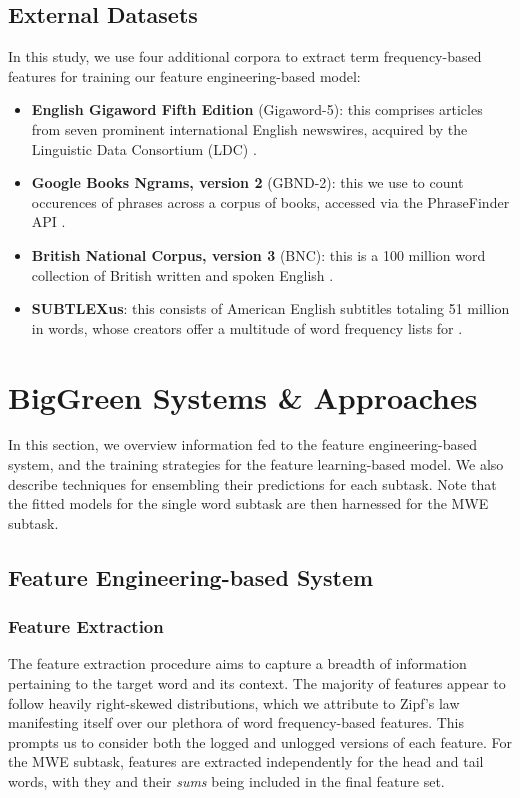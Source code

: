 \documentclass[11pt,a4paper]{article}
\begin{document}
\subsection{External Datasets}

In this study, we use four additional corpora to extract term frequency-based features for training our feature engineering-based model:

\begin{itemize}
  \item \textbf{English Gigaword Fifth Edition} (Gigaword-5): this comprises articles from seven prominent international English newswires, acquired by the Linguistic Data Consortium (LDC) \citep{gigaword}.
  \item \textbf{Google Books Ngrams, version 2} (GBND-2): this we use to count occurences of phrases across a corpus of books, accessed via the PhraseFinder API \citep{phrasefinder}.
  \item \textbf{British National Corpus, version 3} (BNC): this is a 100 million word collection of British written and spoken English \citep{BNC}.
  \item \textbf{SUBTLEXus}: this consists of American English subtitles totaling 51 million in words, whose creators offer a multitude of word frequency lists for \citep{Brysbaert2009MovingBK}.
\end{itemize}

\section{BigGreen Systems \& Approaches}

In this section, we overview information fed to the feature engineering-based system, and the training strategies for the feature learning-based model. We also describe techniques for ensembling their predictions for each subtask. Note that the fitted models for the single word subtask are then harnessed for the MWE subtask.

\subsection{Feature Engineering-based System}

\subsubsection{Feature Extraction}

The feature extraction procedure aims to capture a breadth of information pertaining to the target word and its context. The majority of features appear to follow heavily right-skewed distributions, which we attribute to Zipf's law manifesting itself over our plethora of word frequency-based features. This prompts us to consider both the logged and unlogged versions of each feature. For the MWE subtask, features are extracted independently for the head and tail words, with they and their \textit{sums} being included in the final feature set.
\end{document}
